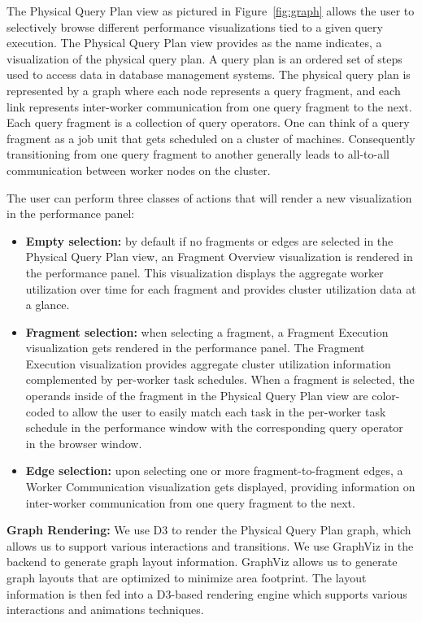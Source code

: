 \documentclass{chi2009}
\newcommand*{\graph}{Physical Query Plan\xspace}
\newcommand*{\fragment}{Fragment Execution\xspace}
\newcommand*{\network}{Worker Communication\xspace}
\newcommand*{\overall}{Fragment Overview\xspace}
\begin{document}
The \graph view as pictured in Figure~\ref{fig:graph} allows the user to selectively browse different performance visualizations tied to a given query execution. The \graph view provides as the name indicates, a visualization of the physical query plan. A query plan is an ordered set of steps used to access data in database management systems. The physical query plan is represented by a graph where each node represents a query fragment, and each link represents inter-worker communication from one query fragment to the next. Each query fragment is a collection of query operators. One can think of a query fragment as a job unit that gets scheduled on a cluster of machines. Consequently transitioning from one query fragment to another generally leads to all-to-all communication between worker nodes on the cluster.


The user can perform three classes of actions that will render a new visualization in the performance panel:
\begin{itemize}

    \item \textbf{Empty selection:} by default if no fragments or edges are selected in the \graph view, an \overall visualization is rendered in the performance panel. This visualization displays the aggregate worker utilization over time for each fragment and provides cluster utilization data at a glance.
    \item \textbf{Fragment selection:} when selecting a fragment, a \fragment visualization gets rendered in the performance panel. The \fragment visualization provides aggregate cluster utilization information complemented by per-worker task schedules. When a fragment is selected, the operands inside of the fragment in the \graph view are color-coded to allow the user to easily match each task in the per-worker task schedule in the performance window with the corresponding query operator in the browser window.
    \item \textbf{Edge selection:} upon selecting one or more fragment-to-fragment edges, a \network visualization gets displayed, providing information on inter-worker communication from one query fragment to the next.

\end{itemize}

\textbf{Graph Rendering:} We use D3 \cite{2011-d3} to render the \graph graph, which allows us to support various interactions and transitions. We use GraphViz \cite{Ellson01graphviz} in the backend to generate graph layout information. GraphViz allows us to generate graph layouts that are optimized to minimize area footprint. The layout information is then fed into a D3-based rendering engine which supports various interactions and animations techniques.
\end{document}
